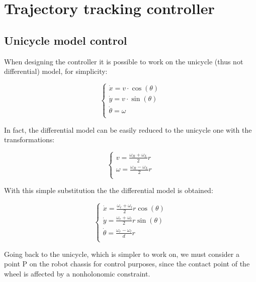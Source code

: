 \documentclass[11pt,a4paper]{article}
\begin{document}

\section{Trajectory tracking controller}



\subsection{Unicycle model control}

When designing the controller it is possible to work on the unicycle (thus not differential) model, for simplicity:

$$
\begin{cases}
    \dot{x} = v \cdot \cos(\theta) \\
    \dot{y} = v \cdot \sin(\theta) \\
    \dot{\theta} = \omega \\
\end{cases}
$$

In fact, the differential model can be easily reduced to the unicycle one with the transformations:

$$
\begin{cases}
    v = {\frac {\omega_R + \omega_L}{2} r} \\
    \omega = {\frac {\omega_R - \omega_L}{2} r} \\
\end{cases}
$$

With this simple substitution the the differential model is obtained:

$$
\begin{cases}
    \dot{x} = \frac{\omega_r + \omega_l}{2} r \cos(\theta) \\
    \dot{y} = \frac{\omega_r + \omega_l}{2} r \sin(\theta) \\
    \dot{\theta} = \frac{\omega_r - \omega_l}{d} r \\
\end{cases}
$$

Going back to the unicycle, which is simpler to work on, we must consider a point P on the robot chassis for
control purposes, since the contact point of the wheel is affected by a nonholonomic constraint.\\
\end{document}

